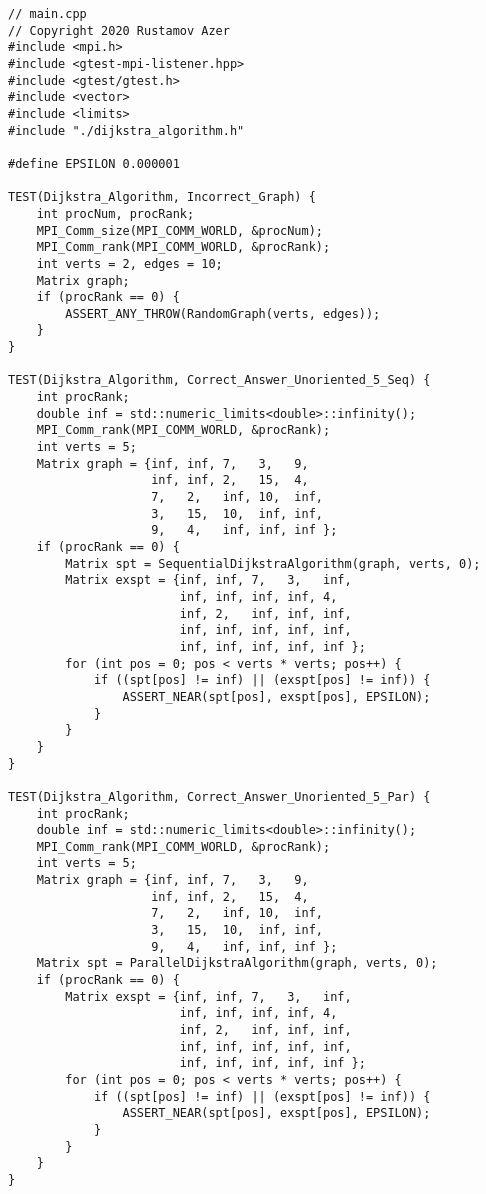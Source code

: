 \documentclass{report}
\begin{document}
\begin{lstlisting}
// main.cpp
// Copyright 2020 Rustamov Azer
#include <mpi.h>
#include <gtest-mpi-listener.hpp>
#include <gtest/gtest.h>
#include <vector>
#include <limits>
#include "./dijkstra_algorithm.h"

#define EPSILON 0.000001

TEST(Dijkstra_Algorithm, Incorrect_Graph) {
    int procNum, procRank;
    MPI_Comm_size(MPI_COMM_WORLD, &procNum);
    MPI_Comm_rank(MPI_COMM_WORLD, &procRank);
    int verts = 2, edges = 10;
    Matrix graph;
    if (procRank == 0) {
        ASSERT_ANY_THROW(RandomGraph(verts, edges));
    }
}

TEST(Dijkstra_Algorithm, Correct_Answer_Unoriented_5_Seq) {
    int procRank;
    double inf = std::numeric_limits<double>::infinity();
    MPI_Comm_rank(MPI_COMM_WORLD, &procRank);
    int verts = 5;
    Matrix graph = {inf, inf, 7,   3,   9,
                    inf, inf, 2,   15,  4,
                    7,   2,   inf, 10,  inf,
                    3,   15,  10,  inf, inf,
                    9,   4,   inf, inf, inf };
    if (procRank == 0) {
        Matrix spt = SequentialDijkstraAlgorithm(graph, verts, 0);
        Matrix exspt = {inf, inf, 7,   3,   inf,
                        inf, inf, inf, inf, 4,
                        inf, 2,   inf, inf, inf,
                        inf, inf, inf, inf, inf,
                        inf, inf, inf, inf, inf };
        for (int pos = 0; pos < verts * verts; pos++) {
            if ((spt[pos] != inf) || (exspt[pos] != inf)) {
                ASSERT_NEAR(spt[pos], exspt[pos], EPSILON);
            }
        }
    }
}

TEST(Dijkstra_Algorithm, Correct_Answer_Unoriented_5_Par) {
    int procRank;
    double inf = std::numeric_limits<double>::infinity();
    MPI_Comm_rank(MPI_COMM_WORLD, &procRank);
    int verts = 5;
    Matrix graph = {inf, inf, 7,   3,   9,
                    inf, inf, 2,   15,  4,
                    7,   2,   inf, 10,  inf,
                    3,   15,  10,  inf, inf,
                    9,   4,   inf, inf, inf };
    Matrix spt = ParallelDijkstraAlgorithm(graph, verts, 0);
    if (procRank == 0) {
        Matrix exspt = {inf, inf, 7,   3,   inf,
                        inf, inf, inf, inf, 4,
                        inf, 2,   inf, inf, inf,
                        inf, inf, inf, inf, inf,
                        inf, inf, inf, inf, inf };
        for (int pos = 0; pos < verts * verts; pos++) {
            if ((spt[pos] != inf) || (exspt[pos] != inf)) {
                ASSERT_NEAR(spt[pos], exspt[pos], EPSILON);
            }
        }
    }
}


\end{lstlisting}
\end{document}
